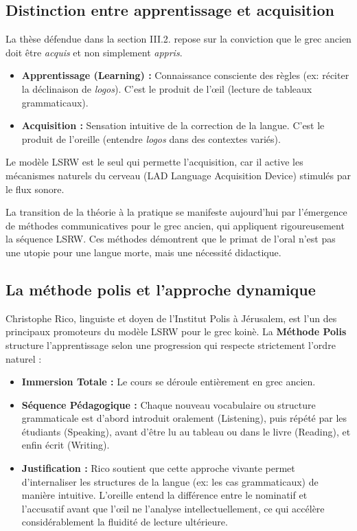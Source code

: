 \subsection{Distinction entre apprentissage et acquisition}

La thèse défendue dans la section III.2.\cite{III-2-1-ref1} repose sur la conviction que le grec
ancien doit être \textit{acquis} et non simplement \textit{appris}.

\begin{itemize}\item \textbf{Apprentissage (Learning) :} Connaissance consciente des règles (ex: réciter la déclinaison de \textit{logos}). C'est le produit de l'œil (lecture de tableaux grammaticaux).\item \textbf{Acquisition :} Sensation intuitive de la correction de la langue. C'est le produit de l'oreille (entendre \textit{logos} dans des contextes variés).\end{itemize}Le modèle LSRW est le seul qui permette l'acquisition, car il active les mécanismes naturels du
cerveau (LAD \- Language Acquisition Device) stimulés par le flux sonore.\cite{III-2-1-ref41}

La transition de la théorie à la pratique se manifeste aujourd'hui par l'émergence de méthodes \og
communicatives\fg{} pour le grec ancien, qui appliquent rigoureusement la séquence LSRW. Ces
méthodes démontrent que le primat de l'oral n'est pas une utopie pour une langue \og morte\fg{},
mais une nécessité didactique.



\subsection{La méthode polis et l'approche dynamique}

Christophe Rico, linguiste et doyen de l'Institut Polis à Jérusalem, est l'un des principaux
promoteurs du modèle LSRW pour le grec koinè.\cite{III-2-1-ref52} La \textbf{Méthode Polis}
structure l'apprentissage selon une progression qui respecte strictement l'ordre naturel :

\begin{itemize}\item \textbf{Immersion Totale :} Le cours se déroule entièrement en grec ancien.\item \textbf{Séquence Pédagogique :} Chaque nouveau vocabulaire ou structure grammaticale est d'abord introduit oralement (Listening), puis répété par les étudiants (Speaking), avant d'être lu au tableau ou dans le livre (Reading), et enfin écrit (Writing).\cite{III-2-1-ref52}\item \textbf{Justification :} Rico soutient que cette approche \og vivante\fg{} permet d'internaliser les structures de la langue (ex: les cas grammaticaux) de manière intuitive. L'oreille \og entend\fg{} la différence entre le nominatif et l'accusatif avant que l'œil ne l'analyse intellectuellement, ce qui accélère considérablement la fluidité de lecture ultérieure.\cite{III-2-1-ref52}\end{itemize}

